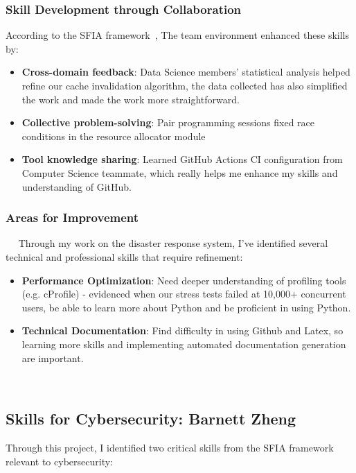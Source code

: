 \documentclass[a4paper, 11pt]{report}
\begin{document}
\subsubsection{Skill Development through Collaboration}
According to the SFIA framework~\cite{sfia}, The team environment enhanced these skills by:
\begin{itemize}
    \item \textbf{Cross-domain feedback}: Data Science members' statistical analysis helped refine our cache invalidation algorithm, the data collected has also simplified the work and made the work more straightforward.
    \item \textbf{Collective problem-solving}: Pair programming sessions fixed race conditions in the resource allocator module
    \item \textbf{Tool knowledge sharing}: Learned GitHub Actions CI configuration from Computer Science teammate, which really helps me enhance my skills and understanding of GitHub.
\end{itemize}

\subsubsection{Areas for Improvement}  
Through my work on the disaster response system, I've identified several technical and professional skills that require refinement:
\begin{itemize}
    \item \textbf{Performance Optimization}: Need deeper understanding of profiling tools (e.g. cProfile) - evidenced when our stress tests failed at 10,000+ concurrent users, be able to learn more about Python and be proficient in using Python. 
    \item \textbf{Technical Documentation}: Find difficulty in using Github and Latex, so learning more skills and implementing automated documentation generation are important.
\end{itemize}   

\subsection{Skills for Cybersecurity: Barnett Zheng}
Through this project, I identified two critical skills from the SFIA framework relevant to cybersecurity:
\end{document}
